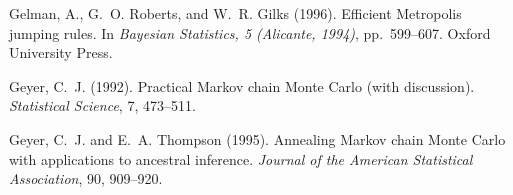 \documentclass{article}
\begin{document}
\begin{thebibliography}{}

Gelman, A., G.~O. Roberts, and W.~R. Gilks (1996).
\newblock Efficient Metropolis jumping rules.
\newblock In \emph{Bayesian Statistics, 5 (Alicante, 1994)}, pp.~599--607.
  Oxford University Press.

Geyer, C.~J. (1992).
\newblock Practical Markov chain Monte Carlo (with discussion).
\newblock \emph{Statistical Science}, 7, 473--511.

Geyer, C.~J. and E.~A. Thompson (1995).
\newblock Annealing Markov chain Monte Carlo with applications to
    ancestral inference.
\newblock \emph{Journal of the American Statistical Association}, 90, 909--920.

\end{thebibliography}
\end{document}
